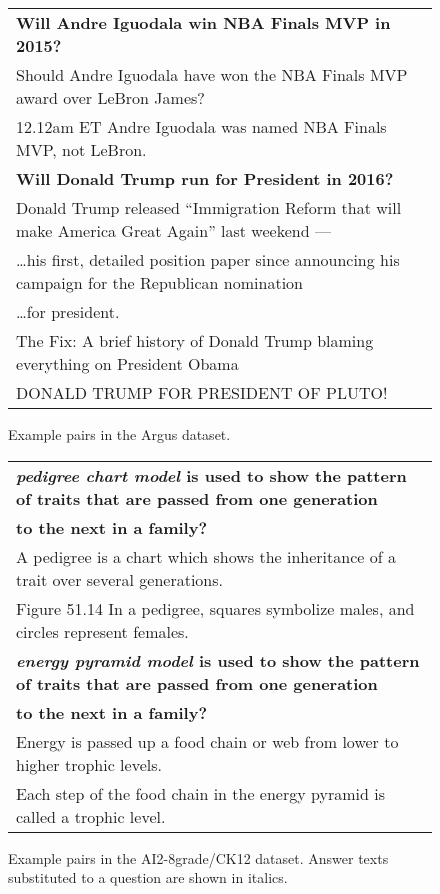 \documentclass[11pt]{article}
\begin{document}
\begin{figure*}
	\begin{tabular}{|l|}
		\hline
	\textbf{Will Andre Iguodala win NBA Finals MVP in 2015?} \\
		Should Andre Iguodala have won the NBA Finals MVP award over LeBron James? \\
		12.12am ET   Andre Iguodala was named NBA Finals MVP, not LeBron. \\
	\hline
	\textbf{Will Donald Trump run for President in 2016?} \\
		Donald Trump released “Immigration Reform that will make America Great Again” last weekend --- \\ \dots his first, detailed position paper since announcing his campaign for the Republican nomination \\ \dots for president. \\
		The Fix: A brief history of Donald Trump blaming everything on President Obama \\
		DONALD TRUMP FOR PRESIDENT OF PLUTO! \\
	\hline
	\end{tabular}
	\vspace*{-0.2cm}
	\caption{\footnotesize%
		Example pairs in the Argus dataset.
	}
	\label{ex:argus}
\end{figure*}

\begin{figure*}
	\begin{tabular}{|l|}
		\hline
	\textbf{\textit{pedigree chart model} is used to show the pattern of traits that are passed from one generation} \\ \textbf{to the next in a family?} \\
		A pedigree is a chart which shows the inheritance of a trait over several generations. \\
		Figure 51.14 In a pedigree, squares symbolize males, and circles represent females. \\
		\hline
	\textbf{\textit{energy pyramid model} is used to show the pattern of traits that are passed from one generation} \\ \textbf{to the next in a family?} \\
		Energy is passed up a food chain or web from lower to higher trophic levels. \\
		Each step of the food chain in the energy pyramid is called a trophic level. \\
		\hline
	\end{tabular}
	\vspace*{-0.2cm}
	\caption{\footnotesize%
		Example pairs in the AI2-8grade/CK12 dataset.
		Answer texts substituted to a question are shown in italics.
	}
	\label{ex:ai2}
\end{figure*}
\end{document}
